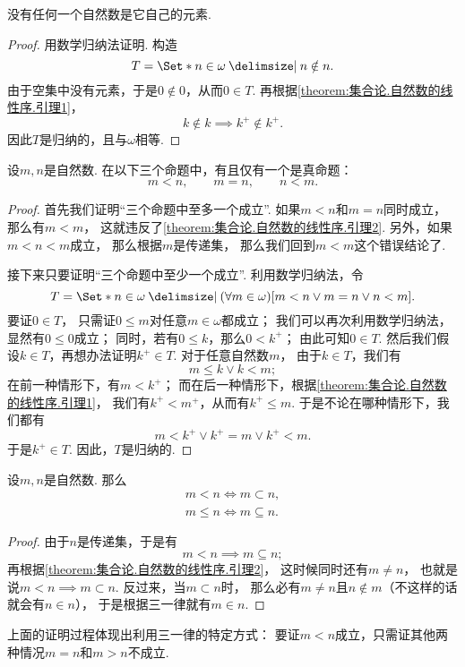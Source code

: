\begin{lemma}\label{theorem:集合论.自然数的线性序.引理2}
没有任何一个自然数是它自己的元素.
\begin{proof}
用数学归纳法证明.
构造\[
	T = \Set*{ n \in \omega \given n \notin n }.
\]
由于空集中没有元素，于是\(0 \notin 0\)，从而\(0 \in T\).
再根据\cref{theorem:集合论.自然数的线性序.引理1}，\[
	k \notin k
	\implies
	k^+ \notin k^+.
\]
因此\(T\)是归纳的，且与\(\omega\)相等.
\end{proof}
\end{lemma}

\begin{theorem}\label{theorem:集合论.自然数集的三一律}
设\(m,n\)是自然数.
在以下三个命题中，有且仅有一个是真命题：\[
	m < n, \qquad
	m = n, \qquad
	n < m.
\]
\begin{proof}
首先我们证明“三个命题中至多一个成立”.
如果\(m < n\)和\(m = n\)同时成立，
那么有\(m < m\)，
这就违反了\cref{theorem:集合论.自然数的线性序.引理2}.
另外，如果\(m < n < m\)成立，
那么根据\(m\)是传递集，
那么我们回到\(m < m\)这个错误结论了.

接下来只要证明“三个命题中至少一个成立”.
利用数学归纳法，令\[
	T = \Set*{
		n \in \omega
		\given
		(\forall m \in \omega)
		[
			m < n
			\lor
			m = n
			\lor
			n < m
		]
	}.
\]
要证\(0 \in T\)，
只需证\(0 \leq m\)对任意\(m \in \omega\)都成立；
我们可以再次利用数学归纳法，
显然有\(0 \leq 0\)成立；
同时，若有\(0 \leq k\)，那么\(0 < k^+\)；
由此可知\(0 \in T\).
然后我们假设\(k \in T\)，再想办法证明\(k^+ \in T\).
对于任意自然数\(m\)，
由于\(k \in T\)，我们有\[
	m \leq k
	\lor
	k < m;
\]
在前一种情形下，有\(m < k^+\)；
而在后一种情形下，根据\cref{theorem:集合论.自然数的线性序.引理1}，
我们有\(k^+ < m^+\)，从而有\(k^+ \leq m\).
于是不论在哪种情形下，我们都有\[
	m < k^+
	\lor
	k^+ = m
	\lor
	k^+ < m.
\]
于是\(k^+ \in T\).
因此，\(T\)是归纳的.
\end{proof}
\end{theorem}

\begin{corollary}
设\(m,n\)是自然数.
那么\begin{gather*}
	m < n \iff m \subset n, \\
	m \leq n \iff m \subseteq n.
\end{gather*}
\begin{proof}
由于\(n\)是传递集，于是有\[
	m < n \implies m \subseteq n;
\]
再根据\cref{theorem:集合论.自然数的线性序.引理2}，
这时候同时还有\(m \neq n\)，
也就是说\(m < n \implies m \subset n\).
反过来，当\(m \subset n\)时，
那么必有\(m \neq n\)且\(n \notin m\)（不这样的话就会有\(n \in n\)），
于是根据三一律就有\(m \in n\).
\end{proof}
\end{corollary}
上面的证明过程体现出利用三一律的特定方式：
要证\(m < n\)成立，只需证其他两种情况\(m = n\)和\(m > n\)不成立.

